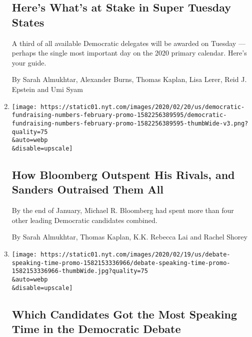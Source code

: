 \begin{enumerate}
  \hypertarget{heres-whats-at-stake-in-super-tuesday-states}{%
  \subsection{Here's What's at Stake in Super Tuesday
  States}\label{heres-whats-at-stake-in-super-tuesday-states}}

  A third of all available Democratic delegates will be awarded on
  Tuesday --- perhaps the single most important day on the 2020 primary
  calendar. Here's your guide.

  By Sarah Almukhtar, Alexander Burns, Thomas Kaplan, Lisa Lerer, Reid
  J. Epstein and Umi Syam
\item
  \href{/interactive/2020/02/21/us/politics/democratic-fundraising-numbers-february.html}{}

  \texttt{[image: https://static01.nyt.com/images/2020/02/20/us/democratic-fundraising-numbers-february-promo-1582256389595/democratic-fundraising-numbers-february-promo-1582256389595-thumbWide-v3.png?quality=75\\\&auto=webp\\\&disable=upscale]}

  \hypertarget{how-bloomberg-outspent-his-rivals-and-sanders-outraised-them-all}{%
  \subsection{How Bloomberg Outspent His Rivals, and Sanders Outraised
  Them
  All}\label{how-bloomberg-outspent-his-rivals-and-sanders-outraised-them-all}}

  By the end of January, Michael R. Bloomberg had spent more than four
  other leading Democratic candidates combined.

  By Sarah Almukhtar, Thomas Kaplan, K.K. Rebecca Lai and Rachel Shorey
\item
  \href{/interactive/2020/02/19/us/elections/debate-speaking-time.html}{}

  \texttt{[image: https://static01.nyt.com/images/2020/02/19/us/debate-speaking-time-promo-1582153336966/debate-speaking-time-promo-1582153336966-thumbWide.jpg?quality=75\\\&auto=webp\\\&disable=upscale]}

  \hypertarget{which-candidates-got-the-most-speaking-time-in-the-democratic-debate}{%
  \subsection{Which Candidates Got the Most Speaking Time in the
  Democratic
  Debate}\label{which-candidates-got-the-most-speaking-time-in-the-democratic-debate}}


\end{enumerate}
